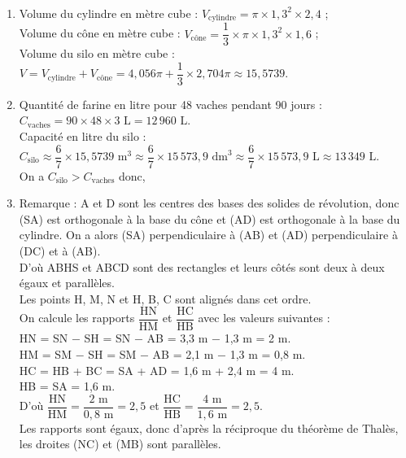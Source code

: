 \ \\ [-5mm]
\begin{enumerate}
   \item Volume du cylindre en mètre cube : $V_{\text{cylindre}} = \pi\times1,3^2\times2,4$ ; \\
   Volume du cône en mètre cube : $V_{\text{cône}} = \dfrac13\times\pi\times1,3^2\times1,6$ ; \\
   Volume du silo en mètre cube : $V =V_{\text{cylindre}}+V_{\text{cône}} =4,056\pi+\dfrac13\times2,704\pi \approx 15,5739$. \\
   \item Quantité de farine en litre pour 48 vaches pendant 90 jours : $C_{\text{vaches}} =90\times48\times3\text{ L} =12\,960\text{ L}$. \\
    Capacité en litre du silo : $C_{\text{silo}} \approx\dfrac67\times15,5739\text{ m}^3 \approx\dfrac67\times15\,573,9\text{ dm}^3 \approx\dfrac67\times15\,573,9\text{ L} \approx 13\,349\text{ L}$. \\
   On a $C_{\text{silo}}>C_{\text{vaches}}$ donc, 
   \item Remarque : A et D  sont les centres des bases des solides de révolution, donc (SA) est orthogonale à la base du cône et (AD) est orthogonale à la base du cylindre. On a alors (SA) perpendiculaire à (AB) et (AD) perpendiculaire à (DC) et à (AB). \\
   D'où ABHS et ABCD sont des rectangles et leurs côtés sont deux à deux égaux et parallèles. \\
   Les points H, M, N et H, B, C sont alignés dans cet ordre. \\ [1mm]
   On calcule les rapports $\dfrac{\text{HN}}{\text{HM}}$ et $\dfrac{\text{HC}}{\text{HB}}$ avec les valeurs suivantes : \\ [1mm]
   HN = SN $-$ SH = SN $-$ AB = 3,3 m $-$ 1,3 m = 2 m. \\
   HM = SM $-$ SH = SM $-$ AB = 2,1 m $-$ 1,3 m = 0,8 m. \\
   HC = HB + BC = SA + AD = 1,6 m + 2,4 m = 4 m. \\
   HB = SA = 1,6 m. \\ [1mm]
   D'où $\dfrac{\text{HN}}{\text{HM}} =\dfrac{2\text{ m}}{0,8\text{ m}} =2,5$ et $\dfrac{\text{HC}}{\text{HB}} =\dfrac{4\text{ m}}{1,6\text{ m}} =2,5$. \\ [1mm]
   Les rapports sont égaux, donc d'après la réciproque du théorème de Thalès, les droites (NC) et (MB) sont parallèles. 
\end{enumerate}
